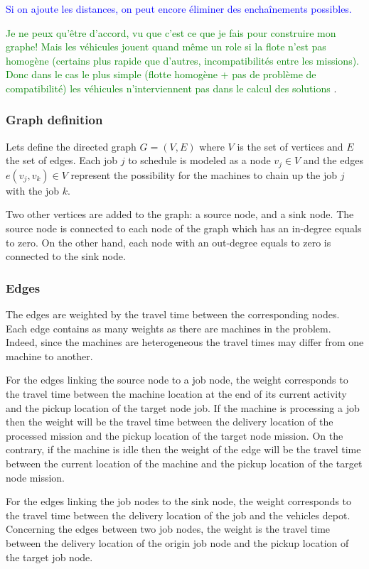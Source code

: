\documentclass[a4paper,10pt]{article}
\begin{document}
\textcolor{blue}{Si on ajoute les distances, on peut encore éliminer des enchaînements possibles. }

\textcolor{green}{Je ne peux qu'être d'accord, vu que c'est ce que je fais pour construire mon graphe! Mais les véhicules jouent quand même un role si la flote n'est pas homogène (certains plus rapide que d'autres, incompatibilités entre les missions). Donc dans le cas le plus simple (flotte homogène + pas de problème de compatibilité) les véhicules n'interviennent pas dans le calcul des solutions}
.
\subsubsection{Graph definition}

Lets define the directed graph $G = (V,E)$ where $V$ is the set of vertices and $E$ the set of edges. Each job $j$ to schedule is modeled as a node $v_j \in V$ and the edges $e(v_j,v_k) \in V$ represent the possibility for the machines to chain up the job $j$ with the job $k$.

Two other vertices are added to the graph: a source node, and a sink node. The source node is connected to each node of the graph which has an in-degree equals to zero. On the other hand, each node with an out-degree equals to zero is connected to the sink node. %


\subsubsection{Edges}
The edges are weighted by the travel time between the corresponding nodes. Each edge contains as many weights as there are machines in the problem. Indeed, since the machines are heterogeneous the travel times may differ from one machine to another.

For the edges linking the source node to a job node, the weight corresponds to the travel time between the machine location at the end of its current activity and the pickup location of the target node job. If the machine is processing a job then the weight will be the travel time between the delivery location of the processed mission and the pickup location of the target node mission. On the contrary, if the machine is idle then the weight of the edge will be the travel time between the current location of the machine and the pickup location of the target node mission.

For the edges linking the job nodes to the sink node, the weight corresponds to the travel time between the delivery location of the job and the vehicles depot.
Concerning the edges between two job nodes, the weight is the travel time between the delivery location of the origin job node and the pickup location of the target job node.
\end{document}
